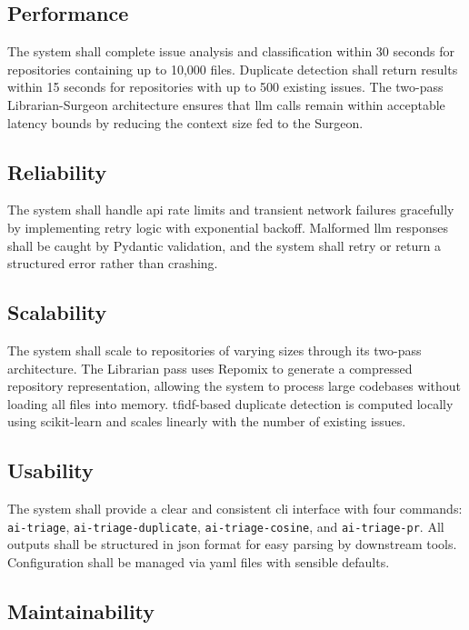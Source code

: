 \subsection{Performance}

The system shall complete issue analysis and classification within 30 seconds for repositories containing up to 10{,}000 files. Duplicate detection shall return results within 15 seconds for repositories with up to 500 existing issues. The two-pass Librarian-Surgeon architecture ensures that \gls{llm} calls remain within acceptable latency bounds by reducing the context size fed to the Surgeon.

\subsection{Reliability}

The system shall handle \gls{api} rate limits and transient network failures gracefully by implementing retry logic with exponential backoff. Malformed \gls{llm} responses shall be caught by Pydantic validation, and the system shall retry or return a structured error rather than crashing.

\subsection{Scalability}

The system shall scale to repositories of varying sizes through its two-pass architecture. The Librarian pass uses Repomix to generate a compressed repository representation, allowing the system to process large codebases without loading all files into memory. \gls{tfidf}-based duplicate detection is computed locally using scikit-learn and scales linearly with the number of existing issues.

\subsection{Usability}

The system shall provide a clear and consistent \gls{cli} interface with four commands: \texttt{ai-triage}, \texttt{ai-triage-duplicate}, \texttt{ai-triage-cosine}, and \texttt{ai-triage-pr}. All outputs shall be structured in \gls{json} format for easy parsing by downstream tools. Configuration shall be managed via \gls{yaml} files with sensible defaults.

\subsection{Maintainability}

